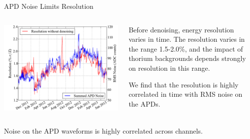\documentclass[final]{beamer} %
\begin{document}
\begin{frame}{}
\begin{columns}[t]
\begin{column}{.3\linewidth}
    \begin{block}{APD Noise Limits Resolution}
      \begin{columns}
        \begin{column}{0.49\linewidth}
          \includegraphics[keepaspectratio=true,width=\textwidth]{ResolutionAPDNoiseComparison.pdf}
         \end{column}
        \begin{column}{0.49\linewidth}
          Before denoising, energy resolution varies in time.  The resolution varies in the range 1.5-2.0\%, and the impact of thorium backgrounds depends strongly on resolution in this range.

We find that the resolution is highly correlated in time with RMS noise on the APDs.
        \end{column}
      \end{columns}

      \begin{columns}
        \begin{column}{0.49\linewidth}
           Noise on the APD waveforms is highly correlated across channels.


\end{column}
\end{columns}
\end{block}
\end{column}
\end{columns}
\end{frame}
\end{document}
